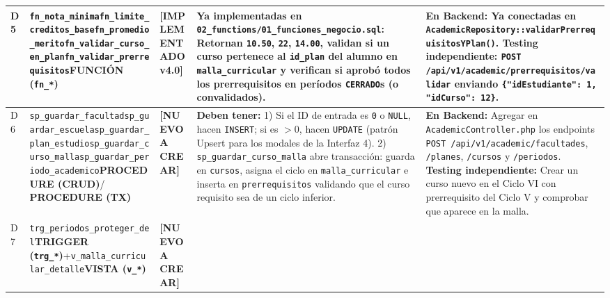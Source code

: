 \documentclass[10pt,a4paper,landscape]{article}
\newcommand{\stListo}{\textbf{\textcolor{teal!80!black}{[IMPLEMENTADO v4.0]}}}
\newcommand{\stNuevo}{\textbf{\textcolor{red!75!black}{[NUEVO A CREAR]}}}
\newcommand{\objProcTx}{\textbf{\textcolor{unjbgNavy}{PROCEDURE (TX)}}}
\newcommand{\objProcCrud}{\textbf{\textcolor{unjbgBlue}{PROCEDURE (CRUD)}}}
\newcommand{\objFunc}{\textbf{\textcolor{teal!80!black}{FUNCIÓN (\texttt{fn\_*})}}}
\newcommand{\objTrig}{\textbf{\textcolor{orange!80!black}{TRIGGER (\texttt{trg\_*})}}}
\newcommand{\objView}{\textbf{\textcolor{violet!85!black}{VISTA (\texttt{v\_*})}}}
\begin{document}
\begin{longtable}{|p{0.5cm}|p{3.8cm}|p{2.9cm}|p{8.8cm}|p{9.2cm}|}
D5 & \texttt{fn\_nota\_minima}\newline \texttt{fn\_limite\_creditos\_base}\newline \texttt{fn\_promedio\_merito}\newline \texttt{fn\_validar\_curso\_en\_plan}\newline \texttt{fn\_validar\_prerrequisitos}\newline \objFunc & \stListo & 
\textbf{Ya implementadas en \texttt{02\_functions/01\_funciones\_negocio.sql}:}
Retornan \texttt{10.50}, \texttt{22}, \texttt{14.00}, validan si un curso pertenece al \texttt{id\_plan} del alumno en \texttt{malla\_curricular} y verifican si aprobó todos los prerrequisitos en períodos \texttt{CERRADO}s (o convalidados). & 
\textbf{En Backend:} Ya conectadas en \texttt{AcademicRepository::validarPrerrequisitosYPlan()}.\newline
\textbf{Testing independiente:} \texttt{POST /api/v1/academic/prerrequisitos/validar} enviando \texttt{\{"idEstudiante": 1, "idCurso": 12\}}. \\
\hline
\rowcolor{rowAlt}
D6 & \texttt{sp\_guardar\_facultad}\newline \texttt{sp\_guardar\_escuela}\newline \texttt{sp\_guardar\_plan\_estudio}\newline \texttt{sp\_guardar\_curso\_malla}\newline \texttt{sp\_guardar\_periodo\_academico}\newline \objProcCrud / \objProcTx & \stNuevo & 
\textbf{Deben tener:}
1) Si el ID de entrada es \texttt{0} o \texttt{NULL}, hacen \texttt{INSERT}; si es $>0$, hacen \texttt{UPDATE} (patrón Upsert para los modales de la Interfaz 4).
2) \texttt{sp\_guardar\_curso\_malla} abre transacción: guarda en \texttt{cursos}, asigna el ciclo en \texttt{malla\_curricular} e inserta en \texttt{prerrequisitos} validando que el curso requisito sea de un ciclo inferior. & 
\textbf{En Backend:} Agregar en \texttt{AcademicController.php} los endpoints \texttt{POST /api/v1/academic/facultades}, \texttt{/planes}, \texttt{/cursos} y \texttt{/periodos}.\newline
\textbf{Testing independiente:} Crear un curso nuevo en el Ciclo VI con prerrequisito del Ciclo V y comprobar que aparece en la malla. \\
\hline
D7 & \texttt{trg\_periodos\_proteger\_del}\newline \objTrig\newline +\newline \texttt{v\_malla\_curricular\_detalle}\newline \objView & \stNuevo & 

\end{longtable}
\end{document}
